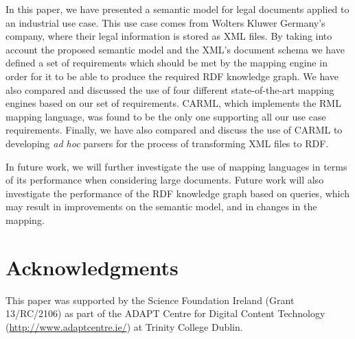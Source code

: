 \documentclass[runningheads]{llncs}
\begin{document}
In this paper, we have presented a semantic model for legal documents applied to an industrial use case. This use case comes from Wolters Kluwer Germany's company, where their legal information is stored as XML files. By taking into account the proposed semantic model and the XML's document schema we have defined a set of requirements which should be met by the mapping engine in order for it to be able to produce the required RDF knowledge graph. We have also compared and discussed the use of four different state-of-the-art mapping engines based on our set of requirements. CARML, which implements the RML mapping language, was found to be the only one supporting all our use case requirements. Finally, we have also compared and discuss the use of CARML to developing \textit{ad hoc} parsers for the process of transforming XML files to RDF. 

In future work, we will further investigate the use of mapping languages in terms of its performance when considering large documents. Future work will also investigate the performance of the RDF knowledge graph based on queries, which may result in improvements on the semantic model, and in changes in the mapping.

\section*{Acknowledgments}
This paper was supported by the Science Foundation Ireland (Grant 13/RC/2106) as part of the ADAPT Centre for Digital Content Technology (\url{http://www.adaptcentre.ie/}) at Trinity College Dublin.




\end{document}
